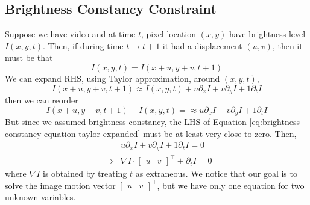\documentclass[11pt]{article}
\begin{document}
\subsection{Brightness Constancy Constraint}
Suppose we have video and at time $t$, pixel location $(x, y)$ have brightness level $I(x, y, t)$. Then, if during time $t \rightarrow t + 1$ it had a displacement $(u, v)$, then it must be that
\begin{equation}
	I(x, y, t)=I(x+u, y+v, t+1)
\end{equation}
We can expand RHS, using Taylor approximation, around $(x, y, t)$, 
\begin{equation}
	I(x+u, y+v, t+1) \approx I (x, y, t) + u \partial_x I + v\partial_y I + 1 \partial_t I
\end{equation}
then we can reorder
\begin{equation}
	I(x+u, y+v, t+1) - I(x, y, t) = \approx u \partial_x I + v\partial_y I + 1 \partial_t I\label{eq:brightness constancy equation taylor expanded}
\end{equation}
But since we assumed brightness constancy, the LHS of Equation \ref{eq:brightness constancy equation taylor expanded} must be at least very close to zero. Then,
\begin{align}
	& u \partial_x I + v\partial_y I + 1 \partial_t I = 0 \\
	\implies & \nabla I \cdot \begin{bmatrix}
		u & v
	\end{bmatrix} ^\top + \partial_t I = 0  \label{eq:brightness constraint equation}
\end{align}
where $\nabla I$ is obtained by treating $t$ as extraneous. We notice that our goal is to solve the image motion vector $\begin{bmatrix}
	u & v
\end{bmatrix}^\top$, but we have only one equation for two unknown variables. 
\end{document}
